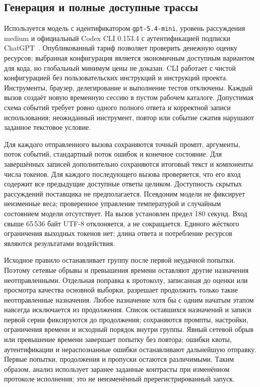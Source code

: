 \subsection{Генерация и полные доступные трассы}
Используется модель с идентификатором \texttt{gpt-5.4-mini}, уровень рассуждения medium и официальный Codex CLI 0.153.4 с аутентификацией подписки ChatGPT~\cite{openai54mini2026,codexexec2026}. Опубликованный тариф позволяет проверить денежную оценку ресурсов; выбранная конфигурация является экономичным доступным вариантом для кода, но глобальный минимум цены не доказан. CLI работает с чистой конфигурацией без пользовательских инструкций и инструкций проекта. Инструменты, браузер, делегирование и выполнение тестов отключены. Каждый вызов создаёт новую временную сессию в пустом рабочем каталоге. Допустимая схема событий требует ровно одного полного ответа и корректной записи использования; неожиданный инструмент, повтор или событие сжатия нарушают заданное текстовое условие.

Для каждого отправленного вызова сохраняются точный промпт, аргументы, поток событий, стандартный поток ошибок и конечное состояние. Для завершённых записей дополнительно сохраняются итоговый текст и компоненты числа токенов. Для каждого последующего вызова проверяется, что его вход содержит все предыдущие доступные ответы целиком. Доступность скрытых рассуждений поставщика не предполагается. Псевдоним модели не фиксирует неизменные веса; проверенное управление температурой и случайным состоянием модели отсутствует. На вызов установлен предел 180 секунд. Вход свыше 65\,536 байт UTF-8 отклоняется, а не сокращается. Единого жёсткого ограничения выходных токенов нет; длина ответа и потребление ресурсов являются результатами воздействия.

Исходное правило останавливает группу после первой неудачной попытки. Поэтому сетевые обрывы и превышения времени оставляют другие назначения неотправленными. Отдельная поправка к протоколу, записанная до оценки или просмотра качества основной выборки, разрешает продолжить только такие неотправленные назначения. Любое назначение хотя бы с одним начатым этапом навсегда исключается из продолжения. Список оставшихся назначений и записи первой серии фиксируются до продолжения; сохраняются промпты, настройки, ограничения времени и исходный порядок внутри группы. Явный сетевой обрыв или превышение времени завершает попытку без повтора; ошибки квоты, аутентификации и нераспознанные ошибки останавливают дальнейшую отправку. Первые попытки, продолжения и пропуски остаются различимыми. Таким образом, анализ использует заранее заданные контрасты при изменённом протоколе исполнения; это не неизменённый пререгистрированный запуск.

